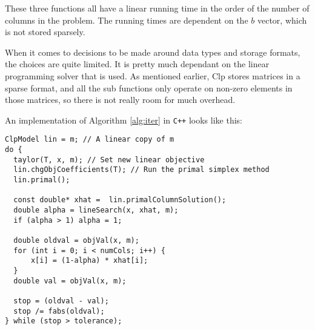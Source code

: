 These three functions all have a linear running time in the order of the number
of columns in the problem. The running times are dependent on the $b$ vector,
which is not stored sparsely.

When it comes to decisions to be made around data types and storage formats,
the choices are quite limited.
It is pretty much dependant on the linear programming solver that is used.
As mentioned earlier, Clp stores matrices in a sparse format, and all the sub
functions only operate on non-zero elements in those matrices, so there is not
really room for much overhead.

An implementation of Algorithm \ref{alg:iter} in \texttt{C++} looks like this:
\begin{verbatim}
ClpModel lin = m; // A linear copy of m
do {
  taylor(T, x, m); // Set new linear objective
  lin.chgObjCoefficients(T); // Run the primal simplex method
  lin.primal();

  const double* xhat =  lin.primalColumnSolution();
  double alpha = lineSearch(x, xhat, m);
  if (alpha > 1) alpha = 1;

  double oldval = objVal(x, m);
  for (int i = 0; i < numCols; i++) {
      x[i] = (1-alpha) * xhat[i];
  }
  double val = objVal(x, m);

  stop = (oldval - val);
  stop /= fabs(oldval);
} while (stop > tolerance);
\end{verbatim}
